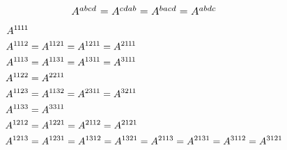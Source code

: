 \begingroup
\small
\allowdisplaybreaks

\setlength{\jot}{.1ex} %

\begin{equation*}
\scalebox{1.1}{$ A^{abcd^{\mathstrut}} = A^{cdab} = A^{bacd} = A^{abdc} $}
\end{equation*}

\nopagebreak\vspace{-2em}
\begin{align*}
A^{1\hspace{-0.1ex}1\hspace{-0.1ex}1\hspace{-0.1ex}1} &
\\
A^{1\hspace{-0.1ex}1\hspace{-0.1ex}12} &
= A^{1\hspace{-0.1ex}121}
= A^{121\hspace{-0.1ex}1}
= A^{21\hspace{-0.1ex}1\hspace{-0.1ex}1}
\\
A^{1\hspace{-0.1ex}1\hspace{-0.1ex}13} &
= A^{1\hspace{-0.1ex}131}
= A^{131\hspace{-0.1ex}1}
= A^{31\hspace{-0.1ex}1\hspace{-0.1ex}1}
\\
A^{1\hspace{-0.1ex}122} &
= A^{221\hspace{-0.1ex}1}
\\
A^{1\hspace{-0.1ex}123} &
= A^{1\hspace{-0.1ex}132}
= A^{231\hspace{-0.1ex}1}
= A^{321\hspace{-0.1ex}1}
\\
A^{1\hspace{-0.1ex}133} &
= A^{331\hspace{-0.1ex}1}
\\
A^{1212} & = A^{1221} = A^{21\hspace{-0.1ex}12} = A^{2121}
\\
A^{1213} & = A^{1231} = A^{1312} = A^{1321} = A^{21\hspace{-0.1ex}13} = A^{2131} = A^{31\hspace{-0.1ex}12} = A^{3121}
\\

\end{align*}

